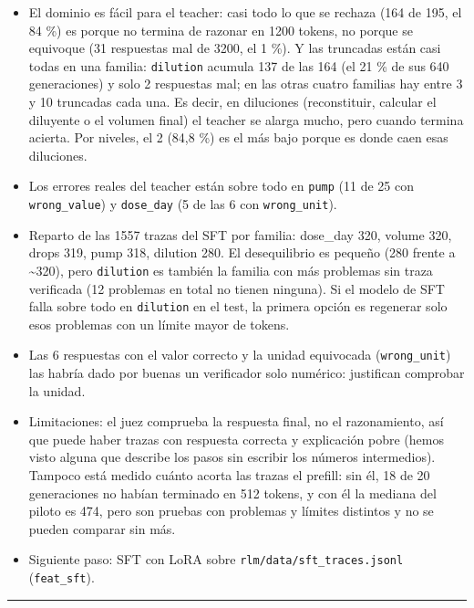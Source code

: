 \begin{itemize}
\tightlist
\item
  El dominio es fácil para el teacher: casi todo lo que se rechaza (164 de 195, el 84 \%) es
  porque no termina de razonar en 1200 tokens, no porque se equivoque (31 respuestas mal de
  3200, el 1 \%). Y las truncadas están casi todas en una familia: \texttt{dilution} acumula 137 de las
  164 (el 21 \% de sus 640 generaciones) y solo 2 respuestas mal; en las otras cuatro familias
  hay entre 3 y 10 truncadas cada una. Es decir, en diluciones (reconstituir, calcular el
  diluyente o el volumen final) el teacher se alarga mucho, pero cuando termina acierta. Por
  niveles, el 2 (84,8 \%) es el más bajo porque es donde caen esas diluciones.
\item
  Los errores reales del teacher están sobre todo en \texttt{pump} (11 de 25 con \texttt{wrong\_\allowbreak{}value}) y
  \texttt{dose\_\allowbreak{}day} (5 de las 6 con \texttt{wrong\_\allowbreak{}unit}).
\item
  Reparto de las 1557 trazas del SFT por familia: dose\_\allowbreak{}day 320, volume 320, drops 319, pump 318,
  dilution 280. El desequilibrio es pequeño (280 frente a \textasciitilde320), pero \texttt{dilution} es también la
  familia con más problemas sin traza verificada (12 problemas en total no tienen ninguna). Si
  el modelo de SFT falla sobre todo en \texttt{dilution} en el test, la primera opción es regenerar solo
  esos problemas con un límite mayor de tokens.
\item
  Las 6 respuestas con el valor correcto y la unidad equivocada (\texttt{wrong\_\allowbreak{}unit}) las habría dado
  por buenas un verificador solo numérico: justifican comprobar la unidad.
\item
  Limitaciones: el juez comprueba la respuesta final, no el razonamiento, así que puede haber
  trazas con respuesta correcta y explicación pobre (hemos visto alguna que describe los pasos
  sin escribir los números intermedios). Tampoco está medido cuánto acorta las trazas el prefill:
  sin él, 18 de 20 generaciones no habían terminado en 512 tokens, y con él la mediana del piloto
  es 474, pero son pruebas con problemas y límites distintos y no se pueden comparar sin más.
\item
  Siguiente paso: SFT con LoRA sobre \texttt{rlm/\allowbreak{}data/\allowbreak{}sft\_\allowbreak{}traces.jsonl} (\texttt{feat\_\allowbreak{}sft}).
\end{itemize}

\begin{center}\rule{0.5\linewidth}{0.5pt}\end{center}

